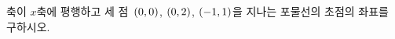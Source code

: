 축이 $x$축에 평행하고 세 점~$(0{,}\mkern3mu\mathopen{}0)$, $(0{,}\mkern3mu\mathopen{}2)$, $(-1{,}\mkern3mu\mathopen{}1)$을 지나는 포물선의 초점의 좌표를 구하시오.
